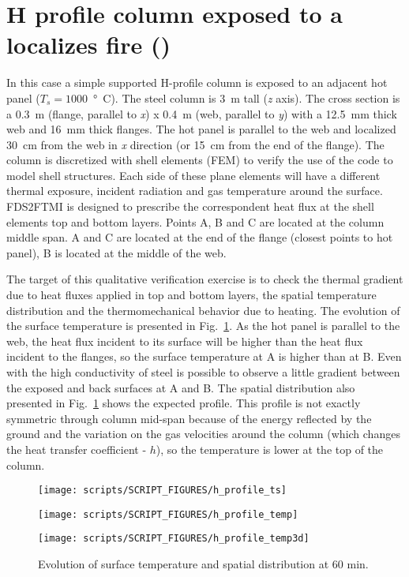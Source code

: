 \documentclass[11pt]{book}
\begin{document}
\section{H profile column exposed to a localizes fire (\texorpdfstring{}{h\_profile})}

In this case a simple supported H-profile column is exposed to an adjacent hot panel ($T_s=1000$~\si{\degree C}). The steel column is 3~m tall (\textit{z} axis). The cross section is a 0.3~m (flange, parallel to \textit{x}) x 0.4~m (web, parallel to \textit{y}) with a 12.5~mm thick web and 16~mm thick flanges. The hot panel is parallel to the web and localized 30~cm from the web in \textit{x} direction (or 15~cm from the end of the flange).
The column is discretized with shell elements (FEM) to verify the use of the code to model shell structures. Each side of these plane elements will have a different thermal exposure, incident radiation and gas temperature around the surface. FDS2FTMI is designed to prescribe the correspondent heat flux at the shell elements top and bottom layers. Points A, B and C are located at the column middle span. A and C are located at the end of the flange (closest points to hot panel), B is located at the middle of the web.

The target of this qualitative verification exercise is to check the thermal gradient due to heat fluxes applied in top and bottom layers, the spatial temperature distribution and the thermomechanical behavior due to heating. The evolution of the surface temperature is presented in Fig.~\ref{h_profile1}. As the hot panel is parallel to the web, the heat flux incident to its surface will be higher than the heat flux incident to the flanges, so the surface temperature at A is higher than at B. Even with the high conductivity of steel is possible to observe a little gradient between the exposed and back surfaces at A and B. The spatial distribution also presented in Fig.~\ref{h_profile1} shows the expected profile. This profile is not exactly symmetric through column mid-span because of the energy reflected by the ground and the variation on the gas velocities around the column (which changes the heat transfer coefficient - $h$), so the temperature is lower at the top of the column.

\begin{figure}[ht]
\noindent
\parbox[c]{22em}{\texttt{[image: scripts/SCRIPT\_FIGURES/h\_profile\_ts]}} 
\parbox[c]{11em}{\texttt{[image: scripts/SCRIPT\_FIGURES/h\_profile\_temp]}} 
\parbox[c]{1em}{\texttt{[image: scripts/SCRIPT\_FIGURES/h\_profile\_temp3d]}} 
\caption[The  results]{Evolution of surface temperature and spatial distribution at 60 min.}
\label{h_profile1}
\end{figure}
\end{document}

